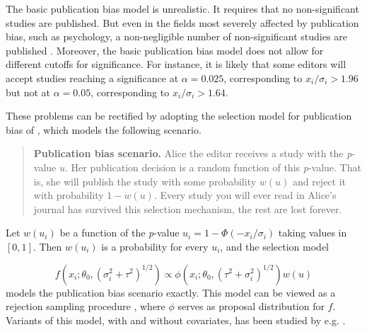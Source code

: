 \documentclass[article]{ajs}
\numberwithin{equation}{section}
\numberwithin{figure}{section}
\theoremstyle{plain}
\theoremstyle{definition}
\theoremstyle{definition}
\theoremstyle{plain}
\renewcommand{\sqrt}[1]{{(#1)^{1/2}}}
\begin{document}
The basic publication bias model is unrealistic. It requires that
no non-significant studies are published. But even in the fields most
severely affected by publication bias, such as psychology, a non-negligible
number of non-significant studies are published \citep{Motyl2017-dx}.
Moreover, the basic publication bias model does not allow for different
cutoffs for significance. For instance, it is likely that some editors
will accept studies reaching a significance at $\alpha=0.025$, corresponding
to $x_{i}/\sigma_{i}>1.96$ but not at $\alpha=0.05$, corresponding
to $x_{i}/\sigma_{i}>1.64$.

These problems can be rectified by adopting the selection model for
publication bias of \citet{iyengar1988selection}, which models the
following scenario.
\begin{quote}
\textbf{Publication bias scenario.} Alice the editor receives a study
with the \emph{p}-value $u$. Her publication decision is a random
function of this \emph{p}-value. That is, she will publish the study
with some probability $w(u)$ and reject it with probability $1-w(u)$.
Every study you will ever read in Alice's journal has survived this
selection mechanism, the rest are lost forever.
\end{quote}
Let $w(u_{i})$ be a function of the \emph{p}-value $u_{i}=1-\Phi(-x_{i}/\sigma_{i})$
taking values in $[0,1]$. Then $w(u_{i})$ is a probability for every
$u_{i}$, and the selection model

\begin{equation}
f(x_{i};\theta_{0},\sqrt{\sigma_{i}^{2}+\tau^{2}})\propto\phi(x_{i};\theta_{0},\sqrt{\tau^{2}+\sigma_{i}^{2}})w(u)\label{eq:iyengar-greenhouse model}
\end{equation}
models the publication bias scenario exactly. This model can be viewed
as a rejection sampling procedure \citep{flury1990acceptance,von1951various},
where $\phi$ serves as proposal distribution for $f$. Variants of
this model, with and without covariates, has been studied by e.g.
\citet{Dear1992-gw,Vevea1995-on,Vevea2005-xp,citkowicz2017parsimonious}.
\end{document}

